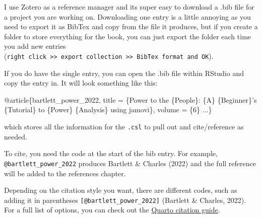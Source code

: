 \documentclass[
  letterpaper,
  DIV=11,
  numbers=noendperiod]{scrreprt}
\newenvironment{Shaded}{\begin{snugshade}}{\end{snugshade}}
\newcommand{\DecValTok}[1]{\textcolor[rgb]{0.68,0.00,0.00}{#1}}
\newcommand{\NormalTok}[1]{\textcolor[rgb]{0.00,0.23,0.31}{#1}}
\newcommand{\OtherTok}[1]{\textcolor[rgb]{0.00,0.23,0.31}{#1}}
\newcommand{\SpecialCharTok}[1]{\textcolor[rgb]{0.37,0.37,0.37}{#1}}
\begin{document}
\begin{tcolorbox}[enhanced jigsaw, colbacktitle=quarto-callout-tip-color!10!white, titlerule=0mm, leftrule=.75mm, title=\textcolor{quarto-callout-tip-color}{\faLightbulb}\hspace{0.5em}{How do I download and edit a .bib file?}, breakable, bottomrule=.15mm, opacitybacktitle=0.6, rightrule=.15mm, opacityback=0, arc=.35mm, colframe=quarto-callout-tip-color-frame, toptitle=1mm, bottomtitle=1mm, toprule=.15mm, left=2mm, colback=white, coltitle=black]

I use Zotero as a reference manager and its super easy to download a
.bib file for a project you are working on. Downloading one entry is a
little annoying as you need to export it as BibTex and copy from the
file it produces, but if you create a folder to store everything for the
book, you can just export the folder each time you add new entries
(\texttt{right\ click\ \textgreater{}\textgreater{}\ export\ collection\ \textgreater{}\textgreater{}\ BibTex\ format\ and\ OK}).

If you do have the single entry, you can open the .bib file within
RStudio and copy the entry in. It will look something like this:

\begin{Shaded}
\begin{Highlighting}[]
\SpecialCharTok{@}\NormalTok{article\{bartlett\_power\_2022,}
\NormalTok{    title }\OtherTok{=}\NormalTok{ \{Power to the \{People\}}\SpecialCharTok{:}\NormalTok{ \{A\} \{Beginner\}’s \{Tutorial\} to \{Power\} \{Analysis\} using jamovi\},}
\NormalTok{    volume }\OtherTok{=}\NormalTok{ \{}\DecValTok{6}\NormalTok{\}}
\NormalTok{    ...\}}
\end{Highlighting}
\end{Shaded}

which stores all the information for the \texttt{.csl} to pull out and
cite/reference as needed.

\end{tcolorbox}

To cite, you need the code at the start of the bib entry. For example,
\texttt{@bartlett\_power\_2022} produces Bartlett \& Charles (2022) and
the full reference will be added to the references chapter.

Depending on the citation style you want, there are different codes,
such as adding it in parentheses \texttt{{[}@bartlett\_power\_2022{]}}
(Bartlett \& Charles, 2022). For a full list of options, you can check
out the \href{https://quarto.org/docs/authoring/citations.html}{Quarto
citation guide}.
\end{document}
